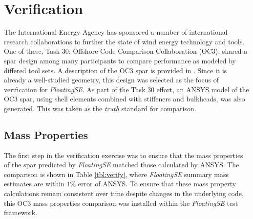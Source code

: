 
\chapter{Verification}
\label{sec:verify}

The International Energy Agency has sponsored a number of international
research collaborations to further the state of wind energy technology and
tools.  One of these, Task 30: Offshore Code Comparison Collaboration
(OC3), shared a spar design among many participants to compare
performance as modeled by differed tool sets.  A description of the OC3
spar is provided in \citet{OC3}.  Since it is already a
well-studied geometry, this design was selected as the focus of
verification for \textit{FloatingSE}.  As part of the Task 30 effort,
an ANSYS model of the OC3 spar, using shell elements combined with
stiffeners and bulkheads, was also generated.  This was taken as
the \textit{truth} standard for comparison.

\section{Mass Properties}
The first step in the verification exercise was to ensure that the mass
properties of the spar predicted by \textit{FloatingSE} matched those
calculated by ANSYS.  The comparison is shown in Table \ref{tbl:verify},
where \textit{FloatingSE} summary mass estimates are within $1\%$ error
of ANSYS.  To ensure that these mass property calculations remain
consistent over time despite changes in the underlying code, this OC3
mass properties comparison was installed within the \textit{FloatingSE}
test framework.

